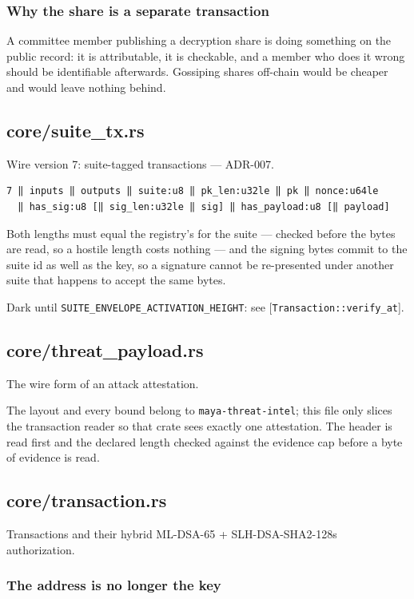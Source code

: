 \documentclass[11pt,a4paper]{article}
\begin{document}
\subsubsection{Why the share is a separate transaction}

A committee member publishing a decryption share is doing something on the
public record: it is attributable, it is checkable, and a member who does it
wrong should be identifiable afterwards. Gossiping shares off-chain would be
cheaper and would leave nothing behind.

\subsection{core/suite\_tx.rs}
Wire version 7: suite-tagged transactions — ADR-007.

\begin{verbatim}
7 ‖ inputs ‖ outputs ‖ suite:u8 ‖ pk_len:u32le ‖ pk ‖ nonce:u64le
  ‖ has_sig:u8 [‖ sig_len:u32le ‖ sig] ‖ has_payload:u8 [‖ payload]
\end{verbatim}

Both lengths must equal the registry's for the suite — checked before the
bytes are read, so a hostile length costs nothing — and the signing bytes
commit to the suite id as well as the key, so a signature cannot be
re-presented under another suite that happens to accept the same bytes.

Dark until \texttt{SUITE\_ENVELOPE\_ACTIVATION\_HEIGHT}: see
[\texttt{Transaction::verify\_at}].

\subsection{core/threat\_payload.rs}
The wire form of an attack attestation.

The layout and every bound belong to \texttt{maya-threat-intel}; this file only
slices the transaction reader so that crate sees exactly one attestation.
The header is read first and the declared length checked against the
evidence cap before a byte of evidence is read.

\subsection{core/transaction.rs}
Transactions and their hybrid ML-DSA-65 + SLH-DSA-SHA2-128s authorization.

\subsubsection{The address is no longer the key}
\end{document}
